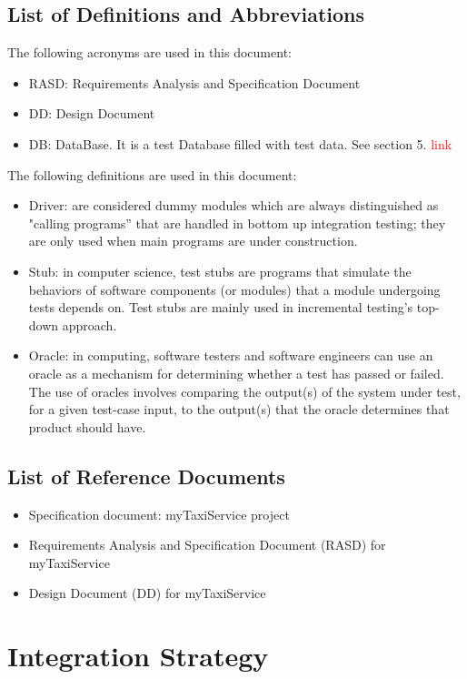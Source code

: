 \documentclass[a4paper,11pt]{report} %
\begin{document}
	\subsection{List of Definitions and Abbreviations}
		The following acronyms are used in this document:
		\begin{itemize}
			\item RASD: Requirements Analysis and Specification Document
			\item DD: Design Document
			\item DB: DataBase. It is a test Database filled with test data. See section 5. \textcolor{red}{link}
		\end{itemize}
		The following definitions are used in this document:
			\begin{itemize}
				\item Driver: are considered dummy modules which are always distinguished as "calling programs” that are handled in bottom up integration testing; they are only used when main programs are under construction.
				\item Stub: in computer science, test stubs are programs that simulate the behaviors of software components (or modules) that a module undergoing tests depends on. Test stubs are mainly used in incremental testing's top-down approach.
				\item Oracle: in computing, software testers and software engineers can use an oracle as a mechanism for determining whether a test has passed or failed. The use of oracles involves comparing the output(s) of the system under test, for a given test-case input, to the output(s) that the oracle determines that product should have.
			\end{itemize}
	\subsection{List of Reference Documents}
		\begin{itemize}
			\item Specification document: myTaxiService project
			\item Requirements Analysis and Specification Document (RASD) for myTaxiService
			\item Design Document (DD) for myTaxiService
		\end{itemize}
	
	
	\section{Integration Strategy}
\end{document}
